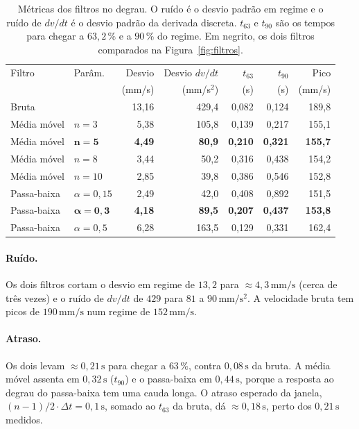 \documentclass[11pt,a4paper]{article}
\newcommand{\unid}[1]{\,\mathrm{#1}}
\begin{document}
\begin{table}[htbp]
\centering
\caption{Métricas dos filtros no degrau. O ruído é o desvio padrão em regime e o ruído de $dv/dt$ é o desvio padrão da derivada discreta. $t_{63}$ e $t_{90}$ são os tempos para chegar a $63{,}2\,\%$ e a $90\,\%$ do regime. Em negrito, os dois filtros comparados na Figura~\ref{fig:filtros}.}
\label{tab:filtros}
\small\setlength{\tabcolsep}{4pt}
\begin{tabular}{llrrrrr}
\toprule
Filtro & Parâm. & Desvio & Desvio $dv/dt$ & $t_{63}$ & $t_{90}$ & Pico \\
 & & (mm/s) & (mm/s$^2$) & (s) & (s) & (mm/s) \\
\midrule
Bruta       &                 & 13,16 & 429,4 & 0,082 & 0,124 & 189,8 \\
Média móvel & $n = 3$         & 5,38  & 105,8 & 0,139 & 0,217 & 155,1 \\
Média móvel & $\mathbf{n = 5}$& \textbf{4,49}  & \textbf{80,9}  & \textbf{0,210} & \textbf{0,321} & \textbf{155,7} \\
Média móvel & $n = 8$         & 3,44  & 50,2  & 0,316 & 0,438 & 154,2 \\
Média móvel & $n = 10$        & 2,85  & 39,8  & 0,386 & 0,546 & 152,8 \\
Passa-baixa & $\alpha = 0{,}15$ & 2,49 & 42,0 & 0,408 & 0,892 & 151,5 \\
Passa-baixa & $\mathbf{\alpha = 0{,}3}$ & \textbf{4,18} & \textbf{89,5} & \textbf{0,207} & \textbf{0,437} & \textbf{153,8} \\
Passa-baixa & $\alpha = 0{,}5$ & 6,28 & 163,5 & 0,129 & 0,331 & 162,4 \\
\bottomrule
\end{tabular}
\end{table}

\paragraph{Ruído.} Os dois filtros cortam o desvio em regime de $13{,}2$ para $\approx 4{,}3\unid{mm/s}$ (cerca de três vezes) e o ruído de $dv/dt$ de $429$ para $81$ a $90\unid{mm/s^2}$. A velocidade bruta tem picos de $190\unid{mm/s}$ num regime de $152\unid{mm/s}$.

\paragraph{Atraso.} Os dois levam $\approx 0{,}21\unid{s}$ para chegar a $63\,\%$, contra $0{,}08\unid{s}$ da bruta. A média móvel assenta em $0{,}32\unid{s}$ ($t_{90}$) e o passa-baixa em $0{,}44\unid{s}$, porque a resposta ao degrau do passa-baixa tem uma cauda longa. O atraso esperado da janela, $(n-1)/2 \cdot \Delta t = 0{,}1\unid{s}$, somado ao $t_{63}$ da bruta, dá $\approx 0{,}18\unid{s}$, perto dos $0{,}21\unid{s}$ medidos.
\end{document}
